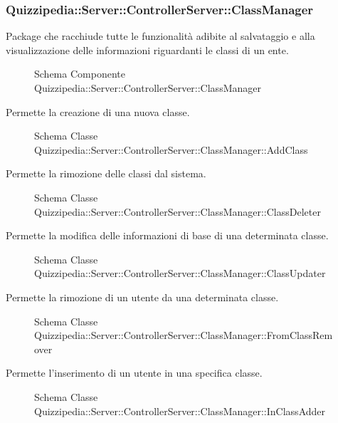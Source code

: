 \subsubsection{Quizzipedia::Server::ControllerServer::ClassManager}
Package che racchiude tutte le funzionalità adibite al salvataggio e alla visualizzazione delle informazioni riguardanti le classi di un ente.
\begin{figure}[H]
\centering
\noindent{}
\caption{Schema Componente Quizzipedia::Server::ControllerServer::ClassManager}
\end{figure}
Permette la creazione di una nuova classe.
\begin{figure}[H]
\centering
\noindent{}
\caption{Schema Classe Quizzipedia::Server::ControllerServer::ClassManager::AddClass}
\end{figure}
Permette la rimozione delle classi dal sistema.
\begin{figure}[H]
\centering
\noindent{}
\caption{Schema Classe Quizzipedia::Server::ControllerServer::ClassManager::ClassDeleter}
\end{figure}
Permette la modifica delle informazioni di base di una determinata classe.
\begin{figure}[H]
\centering
\noindent{}
\caption{Schema Classe Quizzipedia::Server::ControllerServer::ClassManager::ClassUpdater}
\end{figure}
Permette la rimozione di un utente da una determinata classe.
\begin{figure}[H]
\centering
\noindent{}
\caption{Schema Classe Quizzipedia::Server::ControllerServer::ClassManager::FromClassRemover}
\end{figure}
Permette l'inserimento di un utente in una specifica classe.
\begin{figure}[H]
\centering
\noindent{}
\caption{Schema Classe Quizzipedia::Server::ControllerServer::ClassManager::InClassAdder}
\end{figure}
